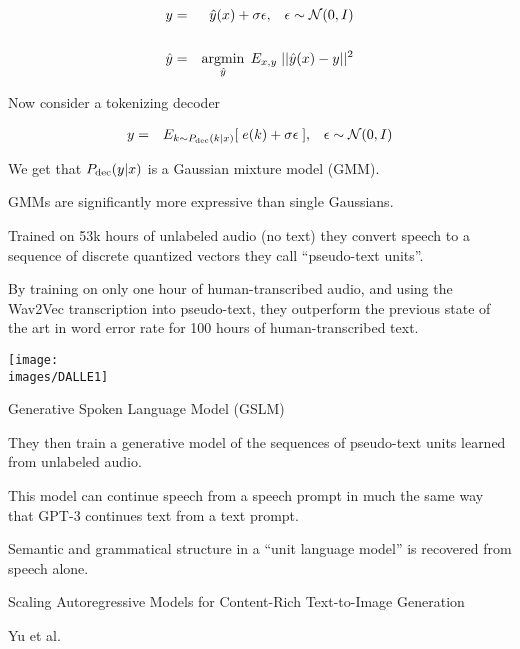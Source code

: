 {{{{\begin{eqnarray*}
y & = & \hat{y}(x) + \sigma \epsilon,\;\;\;\epsilon \sim {\cal N}(0,I) \\
\\
\hat{y} & = & \operatorname*{argmin}_{\hat{y}}\; E_{x,y}\;||\hat{y}(x)-y||^2
\end{eqnarray*}


Now consider a tokenizing decoder

\begin{eqnarray*}
y & = & E_{k\sim P_{\mathrm{dec}}(k|x)}[\; e(k) + \sigma \epsilon\;],\;\;\;\epsilon \sim {\cal N}(0,I) \\
\end{eqnarray*}

We get that $P_{\mathrm{dec}}(y|x)$ is a Gaussian mixture model (GMM).

\vfill
GMMs are significantly more expressive than single Gaussians.

\vfill


\vfill
Trained on 53k hours of unlabeled audio (no text) they convert speech to a sequence of discrete quantized vectors they call ``pseudo-text units''.

\vfill
By training on only one hour of human-transcribed audio, and using the Wav2Vec transcription into pseudo-text, they outperform the previous state of the
art in word error rate for 100 hours of human-transcribed text.


\vfill
\centerline{\texttt{[image: \\images/DALLE1]}}



Generative Spoken Language Model (GSLM)

\vfill
They then train a generative model of the sequences of pseudo-text units learned from unlabeled audio.


\vfill
This model can continue speech from a speech prompt in much the same way that GPT-3 continues text from a text prompt.

\vfill
Semantic and grammatical structure in a ``unit language model'' is recovered
from speech alone.


\centerline{\huge Scaling Autoregressive Models for Content-Rich Text-to-Image Generation}
\centerline{\huge Yu et al.}

}}}}
